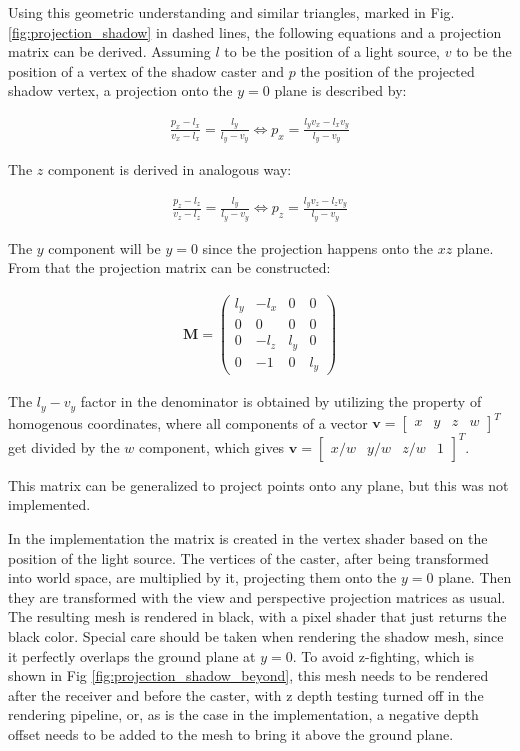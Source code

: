 Using this geometric understanding and similar triangles, marked in Fig. \ref{fig:projection_shadow} in dashed lines, the following equations and a projection matrix can be derived. Assuming \(l\) to be the position of a light source, \(v\) to be the position of a vertex of the shadow caster and \(p\) the position of the projected shadow vertex, a projection onto the \(y=0\) plane is described by:

\begin{align}
	\frac{p_x - l_x}{v_x - l_x} = \frac{l_y}{l_y - v_y} \Longleftrightarrow p_x = \frac{l_yv_x - l_xv_y}{l_y - v_y}
\end{align}

The \(z\) component is derived in analogous way:

\begin{align}
	\frac{p_z - l_z}{v_z - l_z} = \frac{l_y}{l_y - v_y} \Longleftrightarrow p_z = \frac{l_yv_z - l_zv_y}{l_y - v_y}
\end{align}

The \(y\) component will be \(y=0\) since the projection happens onto the \(xz\) plane. From that the projection matrix can be constructed:

\begin{align}
	\mathbf{M} = 
	\begin{pmatrix}
		l_y & -l_x & 0 & 0\\
		0 & 0 & 0 & 0\\
		0 & -l_z & l_y & 0\\
		0 & -1 & 0 & l_y
	\end{pmatrix}
\end{align}

The \(l_y - v_y\) factor in the denominator is obtained by utilizing the property of homogenous coordinates, where all components of a vector \(\mathbf{v} = \begin{bmatrix}x & y & z & w\end{bmatrix}^T\) get divided by the \(w\) component, which gives \(\mathbf{v} = \begin{bmatrix}x/w & y/w & z/w & 1\end{bmatrix}^T\).

This matrix can be generalized to project points onto any plane, but this was not implemented.

In the implementation the matrix is created in the vertex shader based on the position of the light source. The vertices of the caster, after being transformed into world space, are multiplied by it, projecting them onto the \(y=0\) plane. Then they are transformed with the view and perspective projection matrices as usual. The resulting mesh is rendered in black, with a pixel shader that just returns the black color. Special care should be taken when rendering the shadow mesh, since it perfectly overlaps the ground plane at \(y=0\). To avoid z-fighting, which is shown in Fig \ref{fig:projection_shadow_beyond}, this mesh needs to be rendered after the receiver and before the caster, with z depth testing turned off in the rendering pipeline, or, as is the case in the implementation, a negative depth offset needs to be added to the mesh to bring it above the ground plane.

